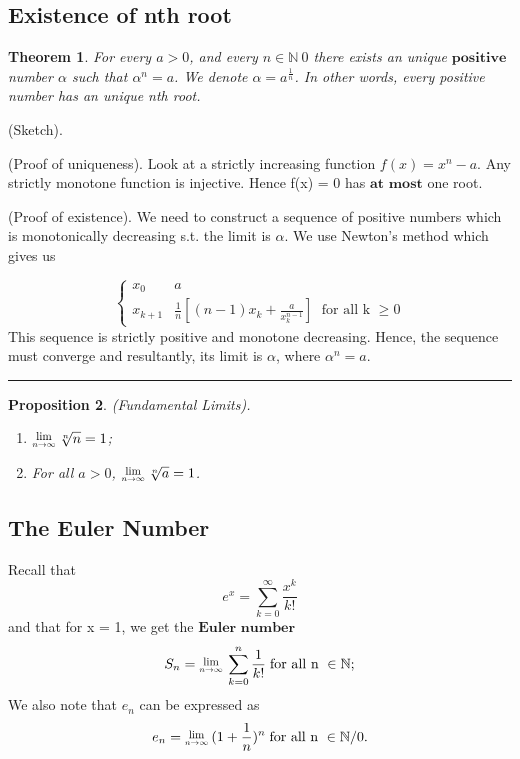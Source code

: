 \documentclass[twoside]{article}
\newcounter{lecnum}
\newcommand{\Lim}[1]{\raisebox{0.5ex}{\scalebox{0.8}{$\displaystyle \lim_{#1}\;$}}}
\newtheorem{theorem}{Theorem}[lecnum]
\newtheorem{proposition}[theorem]{Proposition}
\newenvironment{proof}{{\bf Proof:}}{\hfill\rule{2mm}{2mm}}
\begin{document}
\subsection{Existence of nth root}
\begin{theorem}
    For every $a > 0$, and every $n \in \mathbb{N} \ 0$ there exists an unique $\textbf{positive}$ number $\alpha$ such that $\alpha^n = a$. We denote $\alpha = a^{\frac{1}{n}}$. In other words, every positive number has an unique nth root.
\end{theorem}

\begin{proof}(Sketch).
 
 (Proof of uniqueness). Look at a strictly increasing function $f(x) = x^n - a$. Any strictly monotone function is injective. Hence f(x) = 0 has $\textbf{at most}$ one root.

 (Proof of existence). We need to construct a sequence of positive numbers which is monotonically decreasing s.t. the limit is $\alpha$. We use Newton's method which gives us 

\[ \begin{cases} 
      x_0 & a \\
      x_{k+1} & \frac{1}{n}[(n-1)x_k + \frac{a}{x_k^{n-1}}] \; \text{ for all k } \geq 0
   \end{cases}
\]
This sequence is strictly positive and monotone decreasing. Hence, the sequence must converge and resultantly, its limit is $\alpha$, where $\alpha^n = a$.
\end{proof}

\begin{proposition}
(Fundamental Limits).
\begin{enumerate}
    \item $\Lim{n \rightarrow \infty} \sqrt[n]{n} = 1$;
    \item For all $a > 0$, $\Lim{n \rightarrow \infty} \sqrt[n]{a} = 1$.
\end{enumerate}
\end{proposition}

\subsection{The Euler Number}

Recall that
$$
e^x = \sum_{k=0}^{\infty}\frac{x^k}{k!}
$$
and that for x = 1, we get the $\textbf{Euler number}$
$$
S_n = \Lim{n \rightarrow \infty}\sum_{k=0}^{n}\frac{1}{k!}\; \text{for all n } \in \mathbb{N};
$$
We also note that $e_n$ can be expressed as 
$$
e_n = \Lim{n \rightarrow \infty}(1 + \frac{1}{n})^n \; \text{for all n } \in \mathbb{N} / 0.
$$
\end{document}
